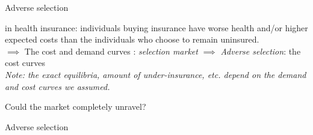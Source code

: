 \begin{frame}{Adverse selection}

     in health insurance:
    individuals buying insurance have worse health and/or higher expected costs than the individuals who choose to remain uninsured.\\
    $\implies$ The cost and demand curves : \textit{selection market}
    $\implies$ \textit{Adverse selection}: the cost curves \\
    \vspace{5mm}
    \textit{Note: the exact equilibria, amount of under-insurance, etc. depend on the demand and cost curves we assumed.}\\
    \vspace{5mm}

    Could the market completely unravel? 
\end{frame}
\begin{frame}{Adverse selection}

\begin{center}
\end{center}
\end{frame}
